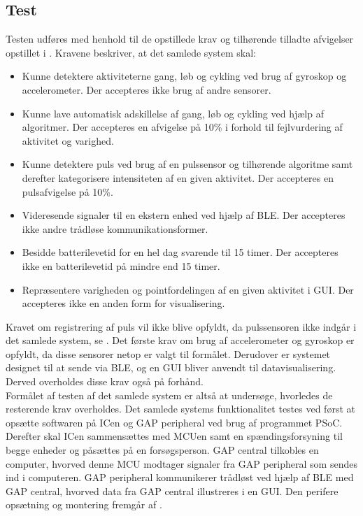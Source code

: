 \subsection{Test}
Testen udføres med henhold til de opstillede krav og tilhørende tilladte afvigelser opstillet i . Kravene beskriver, at det samlede system skal:
\begin{itemize}
	\item Kunne detektere aktiviteterne gang, løb og cykling ved brug af gyroskop og accelerometer. Der accepteres ikke brug af andre sensorer.
	\item Kunne lave automatisk adskillelse af gang, løb og cykling ved hjælp af algoritmer. Der accepteres en afvigelse på 10\% i forhold til fejlvurdering af aktivitet og varighed.
	\item Kunne detektere puls ved brug af en pulssensor og tilhørende algoritme samt derefter kategorisere intensiteten af en given aktivitet. Der accepteres en pulsafvigelse på 10\%.
	\item Videresende signaler til en ekstern enhed ved hjælp af BLE. Der accepteres ikke andre trådløse kommunikationsformer.
	\item Besidde batterilevetid for en hel dag svarende til 15 timer. Der accepteres ikke en batterilevetid på mindre end 15 timer.
	\item Repræsentere varigheden og pointfordelingen af en given aktivitet i GUI. Der accepteres ikke en anden form for visualisering. 
\end{itemize}
Kravet om registrering af puls vil ikke blive opfyldt, da pulssensoren ikke indgår i det samlede system, se . Det første krav om brug af accelerometer og gyroskop er opfyldt, da disse sensorer netop er valgt til formålet. Derudover er systemet designet til at sende via BLE, og en GUI bliver anvendt til datavisualisering. Derved overholdes disse krav også på forhånd. \\
Formålet af testen af det samlede system er altså at undersøge, hvorledes de resterende krav overholdes. Det samlede systems funktionalitet testes ved først at opsætte softwaren på ICen og GAP peripheral ved brug af programmet PSoC. Derefter skal ICen sammensættes med MCUen samt en spændingsforsyning til begge enheder og påsættes på en forsøgsperson. GAP central tilkobles en computer, hvorved denne MCU modtager signaler fra GAP peripheral som sendes ind i computeren. GAP peripheral kommunikerer trådløst ved hjælp af BLE med GAP central, hvorved data fra GAP central illustreres i en GUI. Den perifere opsætning og montering fremgår af .
